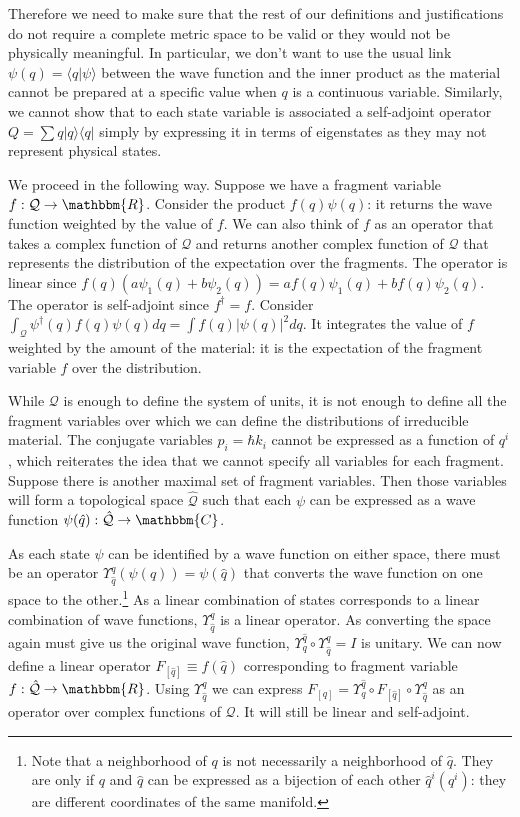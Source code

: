 \documentclass[aps,pra,10pt,twocolumn,floatfix,nofootinbib]{revtex4-1}
\numberwithin{equation}{section}
\theoremstyle{definition}
\begin{document}
Therefore we need to make sure that the rest of our definitions and justifications do not require a complete metric space to be valid or they would not be physically meaningful. In particular, we don't want to use the usual link $\psi(q) = \langle q | \psi \rangle$ between the wave function and the inner product as the material cannot be prepared at a specific value when $q$ is a continuous variable. Similarly, we cannot show that to each state variable is associated a self-adjoint operator $Q = \sum q |q\rangle \langle q |$ simply by expressing it in terms of eigenstates as they may not represent physical states.

We proceed in the following way. Suppose we have a fragment variable $f : \mathcal{Q} \rightarrow \mathbbm{R}$. Consider the product $f (q) \psi (q)$: it returns the wave function weighted by the value of $f$. We can also think of $f$ as an operator that takes a complex function of $\mathcal{Q}$ and returns another complex function of $\mathcal{Q}$ that represents the distribution of the expectation over the fragments. The operator is linear since $f (q) (a\psi_1(q) + b\psi_2(q)) = a f(q) \psi_1(q) + b f(q)  \psi_2(q)$. The operator is self-adjoint since $f^\dagger = f$. Consider $\int_\mathcal{Q} \psi^\dagger (q) f(q) \psi(q) dq = \int f(q) | \psi(q)|^2 dq$. It integrates the value of $f$ weighted by the amount of the material: it is the expectation of the fragment variable $f$ over the distribution. 

While $\mathcal{Q}$ is enough to define the system of units, it is not enough to define all the fragment variables over which we can define the distributions of irreducible material. The conjugate variables $p_i=\hbar k_i$ cannot be expressed as a function of $q^i$, which reiterates the idea that we cannot specify all variables for each fragment. Suppose there is another maximal set of fragment variables. Then those variables will form a topological space $\hat{\mathcal{Q}}$ such that each $\psi$ can be expressed as a wave function $\psi(\hat{q}) :\hat{\mathcal{Q}} \rightarrow \mathbbm{C}$.

As each state $\psi$ can be identified by a wave function on either space, there must be an operator $\Upsilon^q_{\hat{q}}(\psi(q)) = \psi(\hat{q})$ that converts the wave function on one space to the other.\footnote{Note that a neighborhood of $q$ is not necessarily a neighborhood of $\hat{q}$. They are only if $q$ and $\hat{q}$ can be expressed as a bijection of each other $\hat{q}^i(q^i)$: they are different coordinates of the same manifold.} As a linear combination of states corresponds to a linear combination of wave functions, $\Upsilon^q_{\hat{q}}$ is a linear operator. As converting the space again must give us the original wave function, $\Upsilon^{\hat{q}}_{q} \circ \Upsilon^q_{\hat{q}}= I$ is unitary. We can now define a linear operator $F_{[\hat{q}]} \equiv f(\hat{q})$ corresponding to fragment variable $f : \hat{\mathcal{Q}} \rightarrow \mathbbm{R}$. Using $\Upsilon^{q}_{\hat{q}}$ we can express $F_{[q]} = \Upsilon^{\hat{q}}_{q} \circ F_{[\hat{q}]} \circ  \Upsilon^{q}_{\hat{q}}$ as an operator over complex functions of $\mathcal{Q}$. It will still be linear and self-adjoint.
\end{document}
